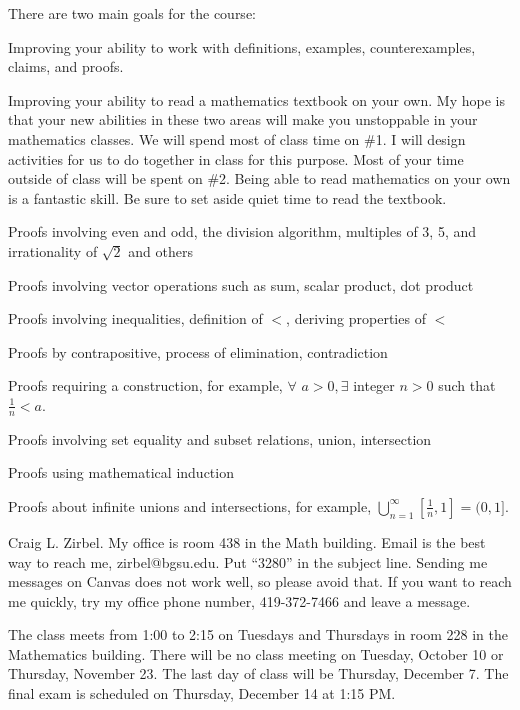 \vspace*{-0.2in}

There are two main goals for the course:
\blist{0.0in}
\item Improving your ability to work with definitions, examples, counterexamples, claims, and proofs.
\item Improving your ability to read a mathematics textbook on your own.
\elist
My hope is that your new abilities in these two areas will make you unstoppable in your mathematics classes.
We will spend most of class time on \#1.  
I will design activities for us to do together in class for this purpose.
Most of your time outside of class will be spent on \#2.
Being able to read mathematics on your own is a fantastic skill.
Be sure to set aside quiet time to read the textbook.

\balist{0.0in}
\item Proofs involving even and odd, the division algorithm, multiples of 3, 5, and irrationality of $\sqrt{2}$ and others
\item Proofs involving vector operations such as sum, scalar product, dot product
\item Proofs involving inequalities, definition of $<$, deriving properties of $<$
\item Proofs by contrapositive, process of elimination, contradiction
\item Proofs requiring a construction, for example, $\forall$ $a > 0, \exists$ integer $n > 0$ such that $\frac{1}{n} < a$.
\item Proofs involving set equality and subset relations, union, intersection
\item Proofs using mathematical induction
\item Proofs about infinite unions and intersections, for example, $\bigcup_{n=1}^{\infty} [\frac{1}{n}, 1] = (0,1]$.
\ealist

Craig L. Zirbel.
My office is room 438 in the Math building.
Email is the best way to reach me, zirbel@bgsu.edu.
Put ``3280'' in the subject line.
Sending me messages on Canvas does not work well, so please avoid that.
If you want to reach me quickly, try my office phone number, 419-372-7466 and leave a message.

The class meets from 1:00 to 2:15 on Tuesdays and Thursdays in room 228 in the Mathematics building.
There will be no class meeting on Tuesday, October 10 or Thursday, November 23.
The last day of class will be Thursday, December 7.
The final exam is scheduled on Thursday, December 14 at 1:15 PM.

